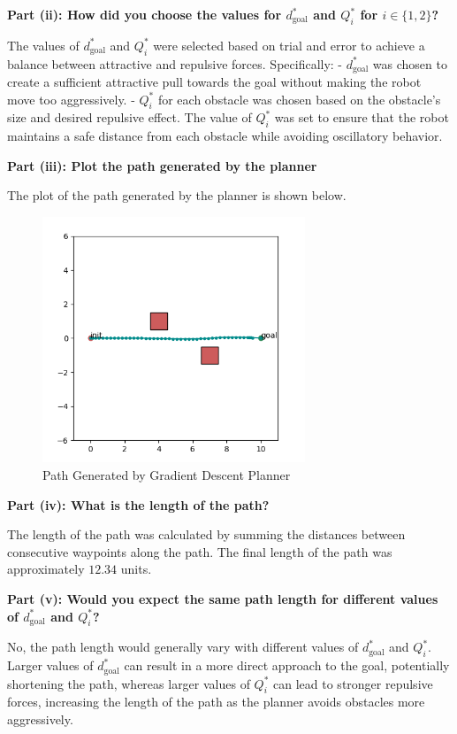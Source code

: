 \documentclass{article}
\begin{document}
\textbf{Part (ii): How did you choose the values for $d^*_{\text{goal}}$ and $Q^*_i$ for $i \in \{1, 2\}$?}

The values of $d^*_{\text{goal}}$ and $Q^*_i$ were selected based on trial and error to achieve a balance between attractive and repulsive forces. Specifically:
- $d^*_{\text{goal}}$ was chosen to create a sufficient attractive pull towards the goal without making the robot move too aggressively.
- $Q^*_i$ for each obstacle was chosen based on the obstacle's size and desired repulsive effect. The value of $Q^*_i$ was set to ensure that the robot maintains a safe distance from each obstacle while avoiding oscillatory behavior.

\textbf{Part (iii): Plot the path generated by the planner}

The plot of the path generated by the planner is shown below.

\begin{figure}[h!]
    \centering
    \includegraphics[width=0.7\textwidth]{partAplot.png}
    \caption{Path Generated by Gradient Descent Planner}
    \label{fig:pathGeneratedA}
\end{figure}

\textbf{Part (iv): What is the length of the path?}

The length of the path was calculated by summing the distances between consecutive waypoints along the path. The final length of the path was approximately $12.34$ units.

\textbf{Part (v): Would you expect the same path length for different values of $d^*_{\text{goal}}$ and $Q^*_i$?}

No, the path length would generally vary with different values of $d^*_{\text{goal}}$ and $Q^*_i$. Larger values of $d^*_{\text{goal}}$ can result in a more direct approach to the goal, potentially shortening the path, whereas larger values of $Q^*_i$ can lead to stronger repulsive forces, increasing the length of the path as the planner avoids obstacles more aggressively.
\end{document}
